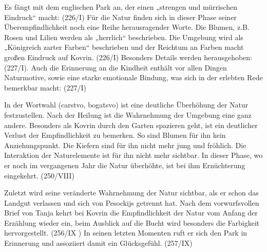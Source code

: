 \documentclass{../../sem_paper}
\begin{document}
Es fängt mit dem englischen Park an, der einen „strengen und mürrischen Eindruck“ macht:
(226/I) Für die
Natur finden sich in dieser Phase seiner Überempfindlichkeit noch eine Reihe herausragender
Worte. Die Blumen, z.B. Rosen und Lilien werden als „herrlich“ beschrieben. Die Umgebung wird
als „Königreich zarter Farben“ beschrieben und der Reichtum an Farben macht großen Eindruck auf
Kovrin. (226/I) Besonders Details
werden herausgehoben: (227/I). Auch die Erinnerung an die Kindheit
enthält vor allen Dingen Naturmotive, sowie eine starke emotionale Bindung, was sich in der
erlebten Rede bemerkbar macht: (227/I)

In der Wortwahl (carstvo, bogatsvo) ist eine deutliche Überhöhung der Natur festzustellen.
Nach der Heilung ist die Wahrnehmung der Umgebung eine ganz andere. Besonders als Kovrin
durch den Garten spazieren geht, ist ein deutlicher Verlust der Empfindlichkeit zu bemerken. So
sind Blumen für ihn kein Anziehungspunkt. Die Kiefern sind für ihn nicht mehr jung und fröhlich.
Die Interaktion der Naturelemente ist für ihn nicht mehr sichtbar. In dieser Phase, wo er noch im
vergangenen Jahr die Natur überhöhte, ist bei ihm Ernüchterung eingekehrt. 
(250/VIII)

Zuletzt wird seine veränderte Wahrnehmung der Natur sichtbar, als er schon das
Landgut verlassen und sich von Pesockijs getrennt hat. Nach dem vorwurfsvollen Brief von Tanja
kehrt bei Kovrin die Empfindlichkeit der Natur vom Anfang der Erzählung wieder ein, beim
Ausblick auf die Bucht wird besonders die Farbigkeit hervorgestellt. (256/IX ) In seinen letzten Momenten
ruft er sich den Park in Erinnerung und assoziiert damit ein Glücksgefühl.
(257/IX)
\end{document}

